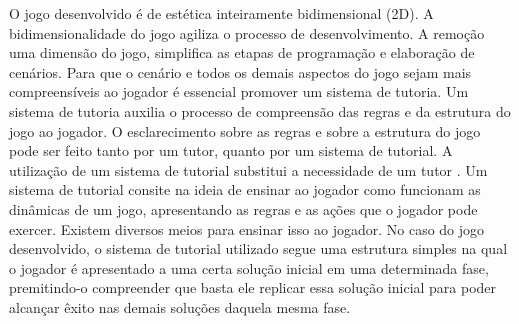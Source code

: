 
O jogo desenvolvido é de estética inteiramente bidimensional (2D). A bidimensionalidade do jogo agiliza o processo de desenvolvimento. A remoção uma dimensão do jogo, simplifica as etapas de programação e elaboração de cenários. Para que o cenário e todos os demais aspectos do jogo sejam mais compreensíveis ao jogador é essencial promover um sistema de tutoria. Um sistema de tutoria auxilia o processo de compreensão das regras e da estrutura do jogo ao jogador. O esclarecimento sobre as regras e sobre a estrutura do jogo pode ser feito tanto por um tutor, quanto por um sistema de tutorial. A utilização de um sistema de tutorial substitui a necessidade de um tutor \cite{buchinger2014sherlock}. Um sistema de tutorial consite na ideia de  ensinar ao jogador como funcionam as dinâmicas de um jogo, apresentando as regras e as ações que o jogador pode exercer. Existem diversos meios para ensinar isso ao jogador. No caso do jogo desenvolvido, o sistema de tutorial utilizado segue uma estrutura simples na qual o jogador é apresentado a uma certa solução inicial em uma determinada fase, premitindo-o compreender que basta ele replicar essa solução inicial para poder alcançar êxito nas demais soluções daquela mesma fase. 


